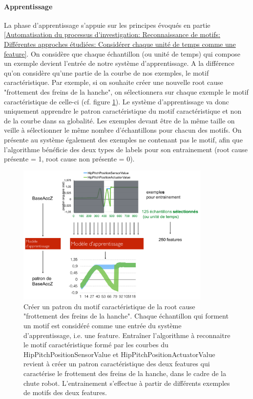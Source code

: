 \paragraph{Apprentissage} La phase d'apprentissage s'appuie sur les principes évoqués en partie \ref{Automatisation du processus d'investigation: Reconnaissance de motifs: Différentes approches étudiées: Considérer chaque unité de temps comme une feature}. On considère que chaque échantillon (ou unité de temps) qui compose un exemple devient l'entrée de notre système d'apprentissage. A la différence qu'on considère qu'une partie de la courbe de nos exemples, le motif caractéristique. Par exemple, si on souhaite créer une nouvelle root cause "frottement des freins de la hanche", on sélectionnera sur chaque exemple le motif caractéristique de celle-ci (cf. figure \ref{fig:Créer un patron du motif caractéristique de la root cause "frottement des freins de la hanche"}). Le système d'apprentissage va donc uniquement apprendre le patron caractéristique du motif caractéristique et non de la courbe dans sa globalité. Les exemples devant être de la même taille on veille à sélectionner le même nombre d'échantillons pour chacun des motifs. On présente au système également des exemples ne contenant pas le motif, afin que l'algorithme bénéficie des deux types de labels pour son entrainement (root cause présente = 1, root cause non présente = 0).

\begin{figure}[h]
	\centering\includegraphics[height=7cm]{images/patron_motif.png}
	\caption[Créer un patron du motif caractéristique de la root cause "frottement des freins de la hanche"]{Créer un patron du motif caractéristique de la root cause "frottement des freins de la hanche". Chaque échantillon qui forment un motif est considéré comme une entrée du système d'apprentissage, i.e. une feature. Entraîner l'algorithme à reconnaitre le motif caractéristique formé par les courbes du HipPitchPositionSensorValue et HipPitchPositionActuatorValue revient à créer un patron caractéristique des deux features qui caractérise le frottement des freins de la hanche, dans le cadre de la chute robot. L'entrainement s'effectue à partir de différents exemples de motifs des deux features.}
	\label{fig:Créer un patron du motif caractéristique de la root cause "frottement des freins de la hanche"}
\end{figure}

